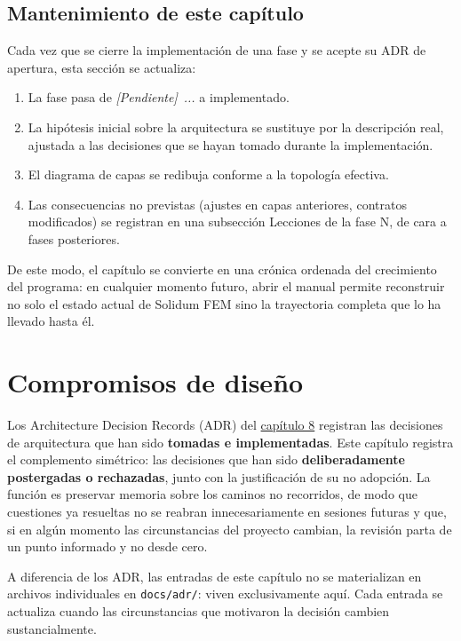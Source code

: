 \documentclass[11pt,oneside]{report}
\newcommand{\pendiente}[1]{\textcolor{pendienteorange}{\textit{[Pendiente]}~\textcolor{pendienteorange}{\textit{#1}}}}
\begin{document}
\section{Mantenimiento de este capítulo}

Cada vez que se cierre la implementación de una fase y se acepte su ADR de apertura, esta sección se actualiza:

\begin{enumerate}
  \item La fase pasa de \textquotedbl{}\pendiente{...}\textquotedbl{} a \textquotedbl{}implementado\textquotedbl{}.
  \item La hipótesis inicial sobre la arquitectura se sustituye por la descripción real, ajustada a las decisiones que se hayan tomado durante la implementación.
  \item El diagrama de capas se redibuja conforme a la topología efectiva.
  \item Las consecuencias no previstas (ajustes en capas anteriores, contratos modificados) se registran en una subsección \textquotedbl{}Lecciones de la fase N\textquotedbl{}, de cara a fases posteriores.
\end{enumerate}

De este modo, el capítulo se convierte en una crónica ordenada del crecimiento del programa: en cualquier momento futuro, abrir el manual permite reconstruir no solo el estado actual de Solidum FEM sino la trayectoria completa que lo ha llevado hasta él.


\newpage

\chapter{Compromisos de diseño}
\label{cap:10}



Los Architecture Decision Records (ADR) del \hyperref[cap:8]{capítulo 8} registran las decisiones de arquitectura que han sido \textbf{tomadas e implementadas}. Este capítulo registra el complemento simétrico: las decisiones que han sido \textbf{deliberadamente postergadas o rechazadas}, junto con la justificación de su no adopción. La función es preservar memoria sobre los caminos no recorridos, de modo que cuestiones ya resueltas no se reabran innecesariamente en sesiones futuras y que, si en algún momento las circunstancias del proyecto cambian, la revisión parta de un punto informado y no desde cero.

A diferencia de los ADR, las entradas de este capítulo no se materializan en archivos individuales en \texttt{docs/adr/}: viven exclusivamente aquí. Cada entrada se actualiza cuando las circunstancias que motivaron la decisión cambien sustancialmente.
\end{document}
